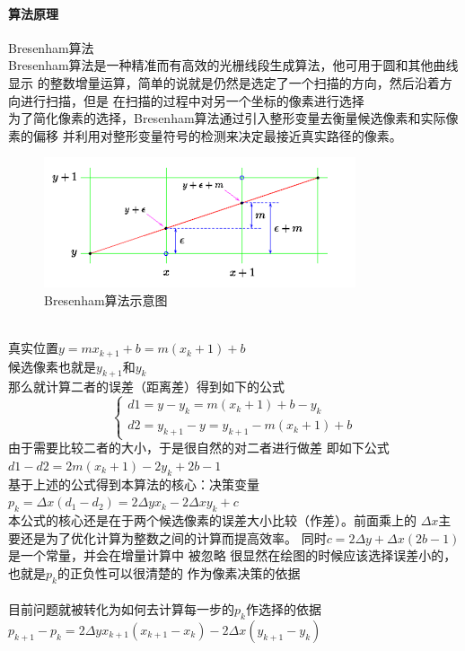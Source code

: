 \documentclass[a4paper,UTF8]{article}
\theoremstyle{definition}
\begin{document}
\paragraph{算法原理}
Bresenham算法\\
Bresenham算法是一种精准而有高效的光栅线段生成算法，他可用于圆和其他曲线显示
的整数增量运算，简单的说就是仍然是选定了一个扫描的方向，然后沿着方向进行扫描，但是
在扫描的过程中对另一个坐标的像素进行选择\\
为了简化像素的选择，Bresenham算法通过引入整形变量去衡量候选像素和实际像素的偏移
并利用对整形变量符号的检测来决定最接近真实路径的像素。\\
\begin{figure}[h]
	\centering
	\includegraphics[scale=1]{figure/bresenham.png}
	\caption{Bresenham算法示意图}
	\label{fig:Bresenham}
\end{figure}\\
真实位置$y=mx_{k+1}+b=m(x_k+1)+b$\\
候选像素也就是$y_{k+1}$和$y_k$\\
那么就计算二者的误差（距离差）得到如下的公式
$$
\begin{cases}
    d{1}=y-y_k = m(x_k+1)+b-y_k \\
    d{2}=y_{k+1}-y =y_{k+1}- m(x_k+1)+b
\end{cases}
$$
由于需要比较二者的大小，于是很自然的对二者进行做差
即如下公式\\
\indent $ d{1}-d{2}=2m(x_k+1)-2y_k+2b-1$\\
基于上述的公式得到本算法的核心：决策变量\\
\indent $p_k=\Delta{x}(d_1-d_2)=2\Delta{y}x_k-2\Delta{x}y_k+c$\\
本公式的核心还是在于两个候选像素的误差大小比较（作差）。前面乘上的
$\Delta{x}$主要还是为了优化计算为整数之间的计算而提高效率。
同时$c=2\Delta{y}+\Delta{x}(2b-1)$是一个常量，并会在增量计算中
被忽略
很显然在绘图的时候应该选择误差小的，也就是$p_k$的正负性可以很清楚的
作为像素决策的依据\\\\
目前问题就被转化为如何去计算每一步的$p_k$作选择的依据\\
$p_{k+1}-p_k=2\Delta y x_{k+1}(x_{k+1}-x_k) -2\Delta x( y_{k+1}-y_k)$\\
\end{document}
